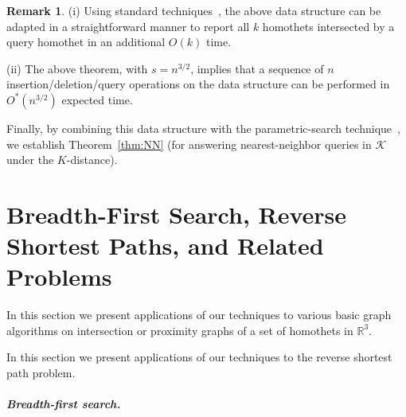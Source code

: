 \documentclass[11pt]{article}
\def\reals{{\mathbb R}}
\def\K{\mathcal{K}}
\newtheorem{theorem}{Theorem}[section]
\theoremstyle{definition}
\newtheorem{remark}{Remark}
\begin{document}
\iffullver
\begin{remark} 
	\label{rem:ds}
	(i) Using standard techniques~\cite{Mat92,AM95}, the above data structure can be adapted in a 
        straightforward manner to report all $k$ homothets intersected by 
	a query homothet in an additional $O(k)$ time.

	(ii) The above theorem, with $s = n^{3/2}$, implies that a sequence of $n$ insertion/deletion/query 
        operations on the data structure can be performed in $O^*(n^{3/2})$ expected time.
\end{remark}
\fi

Finally, by combining this data structure with the parametric-search technique~\cite{AM93}, 
we establish Theorem~\ref{thm:NN} (for answering nearest-neighbor queries in $\K$ under the $K$-distance).


\iffullver
\section{Breadth-First Search, Reverse Shortest Paths, and Related Problems} 
\label{sec:bfs-rsp}

In this section we present applications of our techniques to various basic graph algorithms
on intersection or proximity graphs of a set of homothets in $\reals^3$.

In this section we present applications of our techniques to the reverse shortest path problem.

\ifsocgproc 
\subparagraph*{Breadth-first search.}
\else
\end{document}
